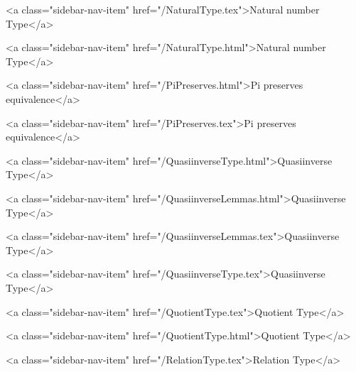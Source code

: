       
        
          <a class="sidebar-nav-item" href="/NaturalType.tex">Natural number Type</a>
        
      
    
      
        
          <a class="sidebar-nav-item" href="/NaturalType.html">Natural number Type</a>
        
      
    
      
        
          <a class="sidebar-nav-item" href="/PiPreserves.html">Pi preserves equivalence</a>
        
      
    
      
        
          <a class="sidebar-nav-item" href="/PiPreserves.tex">Pi preserves equivalence</a>
        
      
    
      
        
          <a class="sidebar-nav-item" href="/QuasiinverseType.html">Quasiinverse Type</a>
        
      
    
      
        
          <a class="sidebar-nav-item" href="/QuasiinverseLemmas.html">Quasiinverse Type</a>
        
      
    
      
        
          <a class="sidebar-nav-item" href="/QuasiinverseLemmas.tex">Quasiinverse Type</a>
        
      
    
      
        
          <a class="sidebar-nav-item" href="/QuasiinverseType.tex">Quasiinverse Type</a>
        
      
    
      
        
          <a class="sidebar-nav-item" href="/QuotientType.tex">Quotient Type</a>
        
      
    
      
        
          <a class="sidebar-nav-item" href="/QuotientType.html">Quotient Type</a>
        
      
    
      
        
          <a class="sidebar-nav-item" href="/RelationType.tex">Relation Type</a>
        
